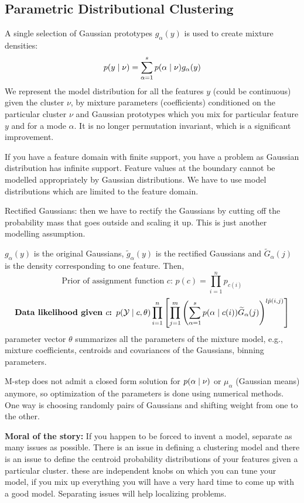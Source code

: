 \documentclass[12pt]{article}
\begin{document}
\subsection{Parametric Distributional Clustering}
A single selection of Gaussian prototypes $g_{\alpha}(y)$ is used to create mixture densities:
\[ p(y \mid \nu) = \sum_{\alpha=1}^s p(\alpha \mid \nu) g_{\alpha}(y) \]
We represent the model distribution for all the features $y$ (could be continuous) given the cluster $\nu$, by mixture parameters (coefficients) conditioned on the particular cluster $\nu$ and Gaussian prototypes which you mix for particular feature $y$ and for a mode $\alpha$. It is no longer permutation invariant, which is a significant improvement.
\par If you have a feature domain with finite support, you have a problem as Gaussian distribution has infinite support. Feature values at the boundary cannot be modelled appropriately by Gaussian distributions. We have to use model distributions which are limited to the feature domain.
\par Rectified Gaussians: then we have to rectify the Gaussians by cutting off the probability mass that goes outside and scaling it up. This is just another modelling assumption.

\par $g_{\alpha}(y)$ is the original Gaussians, $\widetilde{g}_{\alpha}(y)$ is the rectified Gaussians and $\widetilde{G}_{\alpha}(j)$ is the density corresponding to one feature. Then,
\[ \text{Prior of assignment function $c$: } p(c) = \prod_{i=1}^n p_{c(i)} \]
\[ \textbf{Data likelihood given $c$: } p(\mathcal{Y}\mid c,\theta) \prod_{i=1}^n \left[ \prod_{j=1}^m \left( \sum_{\alpha=1}^s p(\alpha \mid c(i)) \widetilde{G}_{\alpha}(j) \right)^{l\hat{p}(i,j)} \right] \]
parameter vector $\theta$ summarizes all the parameters of the mixture model, e.g., mixture coefficients, centroids and covariances of the Gaussians, binning parameters.
\par M-step does not admit a closed form solution for $p(\alpha \mid \nu)$ or $\mu_{\alpha}$ (Gaussian means) anymore, so optimization of the parameters is done using numerical methods. One way is choosing randomly pairs of Gaussians and shifting weight from one to the other.
\par \textbf{Moral of the story:} If you happen to be forced to invent a model, separate as many issues as possible. There is an issue in defining a clustering model and there is an issue to define the centroid probability distributions of your features given a particular cluster. these are independent knobs on which you can tune your model, if you mix up everything you will have a very hard time to come up with a good model. Separating issues will help localizing problems.
\end{document}
